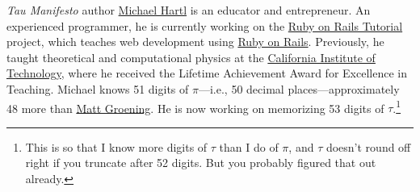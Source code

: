 \documentclass{article}
\begin{document}
\emph{Tau Manifesto} author \href{http://www.michaelhartl.com/}{Michael Hartl} is an educator and entrepreneur. An experienced programmer, he is currently working on the  \href{http://www.railstutorial.org/}{Ruby on Rails Tutorial} project, which teaches web development using \href{http://www.rubyonrails.org/}{Ruby on Rails}. Previously, he taught theoretical and computational physics at the \href{http://www.caltech.edu/}{California Institute of Technology}, where he received the Lifetime Achievement Award for Excellence in Teaching. Michael knows 51 digits of $\pi$---i.e., 50 decimal places---approximately 48 more than \href{http://en.wikipedia.org/wiki/Matt_Groening}{Matt Groening}. He is now working on memorizing 53 digits of $\tau$.\footnote{This is so that I know more digits of $\tau$ than I do of $\pi$, and $\tau$ doesn't round off right if you truncate after 52 digits. But you probably figured that out already.}
\end{document}
